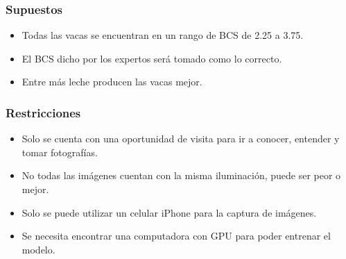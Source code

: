 \subsubsection{Supuestos}

\begin{itemize}
  \item Todas las vacas se encuentran en un rango de BCS de 2.25 a 3.75.
  \item El BCS dicho por los expertos será tomado como lo correcto.
  \item Entre más leche producen las vacas mejor.
\end{itemize}

\subsubsection{Restricciones}

\begin{itemize}
  \item Solo se cuenta con una oportunidad de visita para ir a conocer, entender y tomar fotografías.
  \item No todas las imágenes cuentan con la misma iluminación, puede ser peor o mejor.
  \item Solo se puede utilizar un celular iPhone para la captura de imágenes.
  \item Se necesita encontrar una computadora con GPU para poder entrenar el modelo.
\end{itemize}
